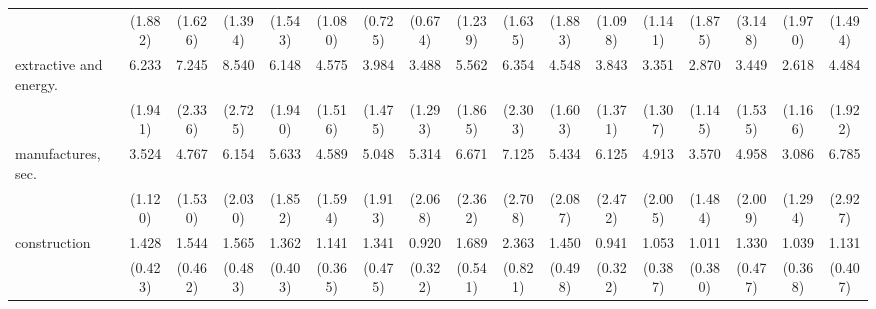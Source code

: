 {\begin{tabular}{l*{16}{c}}
                    &     (1.882)         &     (1.626)         &     (1.394)         &     (1.543)         &     (1.080)         &     (0.725)         &     (0.674)         &     (1.239)         &     (1.635)         &     (1.883)         &     (1.098)         &     (1.141)         &     (1.875)         &     (3.148)         &     (1.970)         &     (1.494)         \\
[1em]
extractive and energy.&       6.233\sym{***}&       7.245\sym{***}&       8.540\sym{***}&       6.148\sym{***}&       4.575\sym{***}&       3.984\sym{***}&       3.488\sym{***}&       5.562\sym{***}&       6.354\sym{***}&       4.548\sym{***}&       3.843\sym{***}&       3.351\sym{**} &       2.870\sym{**} &       3.449\sym{**} &       2.618\sym{*}  &       4.484\sym{***}\\
                    &     (1.941)         &     (2.336)         &     (2.725)         &     (1.940)         &     (1.516)         &     (1.475)         &     (1.293)         &     (1.865)         &     (2.303)         &     (1.603)         &     (1.371)         &     (1.307)         &     (1.145)         &     (1.535)         &     (1.166)         &     (1.922)         \\
[1em]
manufactures, sec.  &       3.524\sym{***}&       4.767\sym{***}&       6.154\sym{***}&       5.633\sym{***}&       4.589\sym{***}&       5.048\sym{***}&       5.314\sym{***}&       6.671\sym{***}&       7.125\sym{***}&       5.434\sym{***}&       6.125\sym{***}&       4.913\sym{***}&       3.570\sym{**} &       4.958\sym{***}&       3.086\sym{**} &       6.785\sym{***}\\
                    &     (1.120)         &     (1.530)         &     (2.030)         &     (1.852)         &     (1.594)         &     (1.913)         &     (2.068)         &     (2.362)         &     (2.708)         &     (2.087)         &     (2.472)         &     (2.005)         &     (1.484)         &     (2.009)         &     (1.294)         &     (2.927)         \\
[1em]
construction        &       1.428         &       1.544         &       1.565         &       1.362         &       1.141         &       1.341         &       0.920         &       1.689         &       2.363\sym{*}  &       1.450         &       0.941         &       1.053         &       1.011         &       1.330         &       1.039         &       1.131         \\
                    &     (0.423)         &     (0.462)         &     (0.483)         &     (0.403)         &     (0.365)         &     (0.475)         &     (0.322)         &     (0.541)         &     (0.821)         &     (0.498)         &     (0.322)         &     (0.387)         &     (0.380)         &     (0.477)         &     (0.368)         &     (0.407)         \\

\end{tabular}}
